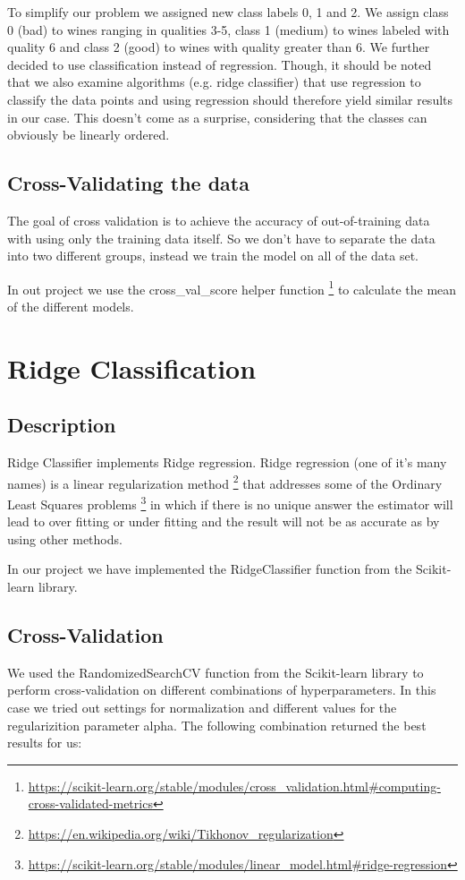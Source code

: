 \documentclass[twocolumn]{scrartcl}
\begin{document}
To simplify our problem we assigned new class labels 0, 1 and 2. We assign class 0 (bad) to wines ranging in qualities 3-5,
class 1 (medium) to wines labeled with quality 6 and class 2 (good) to wines with quality greater than 6.
We further decided to use classification instead of regression.
Though, it should be noted that we also examine algorithms (e.g. ridge classifier) that use regression to classify the data points
and using regression should therefore yield similar results in our case.
This doesn't come as a surprise, considering that the classes can obviously be linearly ordered.

\subsection{Cross-Validating the data}
The goal of cross validation is to achieve the accuracy of out-of-training data with using only the training data itself. So we don't have to separate the data into two different groups, instead we train the model on all of the data set.

In out project we use the cross\_val\_score helper function \footnote{\url{https://scikit-learn.org/stable/modules/cross_validation.html\#computing-cross-validated-metrics}} to calculate the mean  of the different models.

\section{Ridge Classification}
\subsection{Description}
Ridge Classifier implements Ridge regression.
Ridge regression (one of it's many names) is a linear regularization method
\footnote{\url{https://en.wikipedia.org/wiki/Tikhonov_regularization}}
that addresses some of the Ordinary Least Squares problems
\footnote{\url{https://scikit-learn.org/stable/modules/linear_model.html\#ridge-regression}}
in which if there is no unique answer the estimator will lead to over fitting or under fitting and the result will not be as accurate as by using other methods.

In our project we have implemented the RidgeClassifier function from the Scikit-learn library.
\subsection{Cross-Validation}
We used the RandomizedSearchCV function from the Scikit-learn library to perform cross-validation on different combinations of hyperparameters. In this case we tried out settings for normalization and different values for the regularizition parameter alpha. The following combination returned the best results for us:
\end{document}
